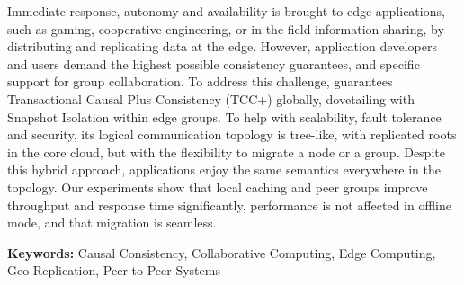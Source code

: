 %
\label{chap:abstract}

\vspace*{8mm}
Immediate response, autonomy and availability is brought to edge
applications, such as gaming, cooperative engineering, or in-the-field
information sharing, by distributing and replicating data at the edge.
However, application developers and users demand the highest
possible consistency guarantees, and specific support for group
collaboration.
To address this challenge, \system{} guarantees Transactional Causal
Plus Consistency (TCC+) globally, dovetailing with Snapshot Isolation
within edge groups.
To help with scalability, fault tolerance and security,
its logical communication topology is tree-like, with replicated roots
in the core cloud, but with the flexibility to migrate a node or a group.
Despite this hybrid approach, applications enjoy the same semantics
everywhere in the topology.
Our experiments show that local caching and peer groups improve
throughput and response time significantly, performance is not affected
in offline mode, and that migration is seamless.

\textbf{Keywords:} 
Causal Consistency, Collaborative Computing, Edge Computing, Geo-Replication,
Peer-to-Peer Systems